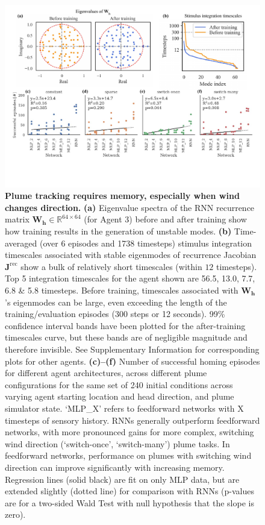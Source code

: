 \documentclass[5p,twocolumn,authoryear]{elsarticle}
\begin{document}
\begin{figure}[htbp!]
\begin{center}
\includegraphics[width=0.95\linewidth]{fig_eigen_mlps.pdf}
\caption{
 \textbf{Plume tracking requires memory, especially when wind changes direction.} 
\textbf{(a)} Eigenvalue spectra of the RNN recurrence matrix $\mathbf{W_{h}} \in \mathbb{R}^{64 \times 64}$ (for Agent 3) before and after training show how training results in the generation of unstable modes.
\textbf{(b)} Time-averaged (over 6 episodes and 1738 timesteps) stimulus integration timescales associated with stable eigenmodes of recurrence Jacobian $\mathbf{J}^{\mathrm{rec}}$ show a bulk of relatively short timescales (within $12$ timesteps).  
Top 5 integration timescales for the agent shown are 56.5, 13.0, 7.7, 6.8 \& 5.8 timesteps.
Before training, timescales associated with $\mathbf{W_{h}}$'s eigenmodes can be large, even exceeding the length of the training/evaluation episodes (300 steps or 12 seconds).
99\% confidence interval bands have been plotted for the after-training timescales curve, but these bands are of negligible magnitude and therefore invisible. 
See Supplementary Information for corresponding plots for other agents.
\textbf{(c)--(f)}
Number of successful homing episodes for different agent architectures, across different plume configurations for the same set of 240 initial conditions across varying agent starting location and head direction, and plume simulator state.
`MLP\_X' refers to feedforward networks with X timesteps of sensory history. 
RNNs generally outperform feedforward networks, with more pronounced gains for more complex, switching wind direction (`switch-once', `switch-many') plume tasks.
In feedforward networks, performance on plumes with switching wind direction can improve significantly with increasing memory.
Regression lines (solid black) are fit on only MLP data, but are extended slightly (dotted line) for comparison with RNNs
(p-values are for a two-sided Wald Test with null hypothesis that the slope is zero).
}
\label{fig_eigen_mlps}
\end{center}
\end{figure}
\end{document}
